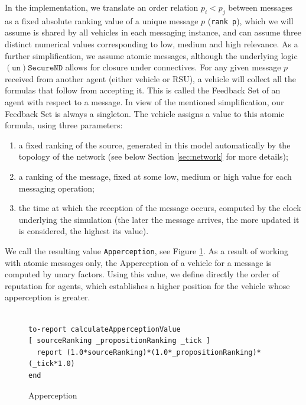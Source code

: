 \documentclass[compsoc, conference, letterpaper, 10pt, times]{IEEEtran}
\newtheorem{definition}{Definition}
\begin{document}
In the implementation, we translate an order relation $p_{i}<p_{j}$ between messages as a fixed absolute ranking value of a unique message $p$ (\texttt{rank p}), which we will assume is shared by all vehicles in each messaging instance, and can assume three distinct numerical values corresponding to low, medium and high relevance. As a further simplification, we assume atomic messages, although the underlying logic $\mathtt{(un)SecureND}$ allows for closure under connectives. For any given message $p$ received from another agent (either vehicle or RSU), a vehicle will collect all the formulas that follow from accepting it. This is called the Feedback Set of an agent with respect to a message. In view of the mentioned simplification, our Feedback Set is always a singleton. The vehicle assigns a value to this atomic formula, using three parameters:
\begin{enumerate}
\item a fixed ranking of the source, generated in this model automatically by the topology of the network (see below Section \ref{sec:network} for more details);
\item a ranking of the message, fixed at some low, medium or high value for each messaging operation;
\item the time at which the reception of the message occurs, computed by the clock underlying the simulation (the later the message arrives, the more updated it is considered, the highest its value).
\end{enumerate}
We call the resulting value \texttt{Apperception}, see Figure \ref{fig:routine1}. As a result of working with atomic messages only, the Apperception of a vehicle for a message is computed by unary factors. Using this value, we define directly the order of reputation for agents, which establishes a higher position for the vehicle whose apperception is greater.

\begin{figure}[t]
 	\lstset{language=Java,
 		basicstyle=\scriptsize,
 		mathescape}
 	\begin{lstlisting}[frame=single]  % Start your code-block

to-report calculateApperceptionValue
[ sourceRanking _propositionRanking _tick ]
  report (1.0*sourceRanking)*(1.0*_propositionRanking)*(_tick*1.0)
end
\end{lstlisting}
\caption{Apperception}\label{fig:routine1}
%
\end{figure}
%
\end{document}
